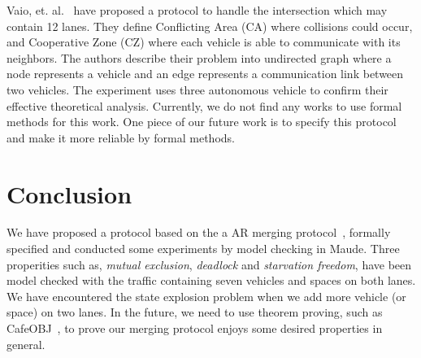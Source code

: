 \documentclass[10pt, conference, compsocconf]{IEEEtran}
\begin{document}
Vaio, et. al.~\cite{8790807} have proposed a protocol to handle the 
intersection which may contain 12 lanes.
They define Conflicting Area (CA) where collisions could occur, and 
Cooperative Zone (CZ) where each vehicle is able to communicate with its neighbors. 
The authors describe their problem into undirected graph where a node 
represents a vehicle and an edge represents a communication link between two vehicles.
The experiment uses three autonomous vehicle to confirm their effective theoretical analysis.
Currently, we do not find any works to use formal methods for this work.
One piece of our future work is to specify this protocol and make 
it more reliable by formal methods.
 
 








\section{Conclusion}
\label{concl_sect}

We have proposed a protocol based on the a AR merging protocol~\cite{10.1145/3055004.3055028}, 
formally specified and conducted some experiments by model checking in Maude.
Three properities such as, \textit{mutual exclusion}, \textit{deadlock} 
and \textit{starvation freedom}, have been model checked with the traffic 
containing seven vehicles and spaces on both lanes.
We have encountered the state explosion problem when we add more vehicle (or space) on two lanes.
In the future, we need to use theorem proving, such as CafeOBJ~\cite{DiaconescuF98}, 
to prove our merging protocol enjoys some desired properties in general.


%
%
\end{document}
